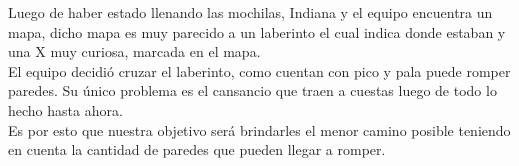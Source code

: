 Luego de haber estado llenando las mochilas, Indiana y el equipo encuentra un mapa, dicho mapa es muy parecido a un laberinto el cual indica donde estaban y una X muy curiosa, marcada en el mapa.\\
El equipo decidi\'o cruzar el laberinto, como cuentan con pico y pala puede romper paredes. Su \'unico problema es el cansancio que traen a cuestas luego de todo lo hecho hasta ahora.\\
Es por esto que nuestra objetivo ser\'a brindarles el menor camino posible teniendo en cuenta la cantidad de paredes que pueden llegar a romper.\\